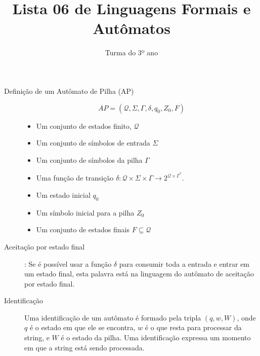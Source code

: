 \documentclass[12pt]{article}
\title{Lista 06 de Linguagens Formais e Autômatos}
\date{}
\author{Turma do 3º ano}
\def\cQ{\mathcal{Q}}
\begin{document}
 

\maketitle

\begin{description}


\item[Definição de um Autômato de Pilha (AP)]
\[AP = (\cQ, \Sigma, \Gamma, \delta, q_0, Z_0, F)\]
\begin{itemize}
\item Um conjunto de estados finito, $\cQ$
\item Um conjunto de símbolos de entrada $\Sigma$
\item Um conjunto de símbolos da pilha $\Gamma$
\item Uma função de transição $\delta: \cQ\times\Sigma\times\Gamma\rightarrow 2^{\cQ\times \Gamma^*}$.
\item Um estado inicial $q_0$
\item Um símbolo inicial para a pilha $Z_0$
\item Um conjunto de estados finais $F\subseteq \cQ$
\end{itemize}


\item[Aceitação por estado final]: Se é possível usar a função $\delta$ para consumir toda a entrada e entrar em um estado final, esta palavra está na linguagem do autômato de aceitação por estado final.


\item[Identificação] Uma identificação de um autômato é formado pela tripla $(q,w,W)$, onde $q$ é o estado em que ele se encontra, $w$ é o que resta para processar da string, e $W$ é o estado da pilha.
Uma identificação expressa um momento em que a string está sendo processada.



\end{description}

\vspace{3em}
\end{document}
